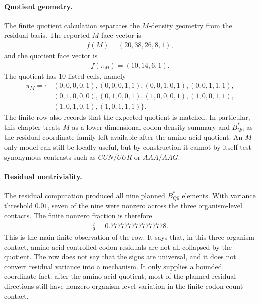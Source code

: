\paragraph{Quotient geometry.}
The finite quotient calculation separates the $M$-density geometry from the residual basis. The reported $M$ face vector is
$$
\begin{aligned}
f(M)=(20,38,26,8,1),
\end{aligned}
$$
and the quotient face vector is
$$
\begin{aligned}
f(\pi_M)=(10,14,6,1).
\end{aligned}
$$
The quotient has $10$ listed cells, namely
$$
\begin{aligned}
\pi_M = \{&(0,0,0,0,1),(0,0,0,1,1),(0,0,1,0,1),(0,0,1,1,1),\\
&(0,1,0,0,0),(0,1,0,0,1),(1,0,0,0,1),(1,0,0,1,1),\\
&(1,0,1,0,1),(1,0,1,1,1)\}.
\end{aligned}
$$
The finite row also records that the expected quotient is matched. In particular, this chapter treats $M$ as a lower-dimensional codon-density summary and $B^{*}_{Q6}$ as the residual coordinate family left available after the amino-acid quotient. An $M$-only model can still be locally useful, but by construction it cannot by itself test synonymous contrasts such as $CUN/UUR$ or $AAA/AAG$.

\paragraph{Residual nontriviality.}
The residual computation produced all nine planned $B^{*}_{Q6}$ elements. With variance threshold $0.01$, seven of the nine were nonzero across the three organism-level contacts. The finite nonzero fraction is therefore
$$
\begin{aligned}
\frac{7}{9}=0.7777777777777778.
\end{aligned}
$$
This is the main finite observation of the row. It says that, in this three-organism contact, amino-acid-controlled codon residuals are not all collapsed by the quotient. The row does not say that the signs are universal, and it does not convert residual variance into a mechanism. It only supplies a bounded coordinate fact: after the amino-acid quotient, most of the planned residual directions still have nonzero organism-level variation in the finite codon-count contact.

